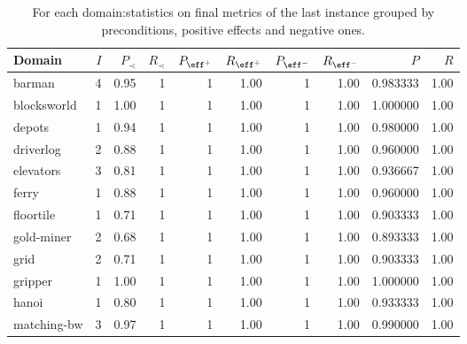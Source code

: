 \begin{table}
\centering
\caption{For each domain:statistics on final metrics of the last instance grouped by preconditions, positive effects and negative ones.}
\label{tab:overall_summary_certain_nostripsass}
\begin{tabular}{lrrrrrrrrr}
\toprule
      Domain & $I$ & $P_{\prec}$ & $R_{\prec}$ & $P_{\eff^{+}}$ & $R_{\eff^{+}}$ & $P_{\eff^{-}}$ & $R_{\eff^{-}}$ &       $P$ &   $R$ \\
\midrule
      barman &   4 &        0.95 &           1 &              1 &           1.00 &              1 &           1.00 &  0.983333 &  1.00 \\
 blocksworld &   1 &        1.00 &           1 &              1 &           1.00 &              1 &           1.00 &  1.000000 &  1.00 \\
      depots &   1 &        0.94 &           1 &              1 &           1.00 &              1 &           1.00 &  0.980000 &  1.00 \\
   driverlog &   2 &        0.88 &           1 &              1 &           1.00 &              1 &           1.00 &  0.960000 &  1.00 \\
   elevators &   3 &        0.81 &           1 &              1 &           1.00 &              1 &           1.00 &  0.936667 &  1.00 \\
       ferry &   1 &        0.88 &           1 &              1 &           1.00 &              1 &           1.00 &  0.960000 &  1.00 \\
   floortile &   1 &        0.71 &           1 &              1 &           1.00 &              1 &           1.00 &  0.903333 &  1.00 \\
  gold-miner &   2 &        0.68 &           1 &              1 &           1.00 &              1 &           1.00 &  0.893333 &  1.00 \\
        grid &   2 &        0.71 &           1 &              1 &           1.00 &              1 &           1.00 &  0.903333 &  1.00 \\
     gripper &   1 &        1.00 &           1 &              1 &           1.00 &              1 &           1.00 &  1.000000 &  1.00 \\
       hanoi &   1 &        0.80 &           1 &              1 &           1.00 &              1 &           1.00 &  0.933333 &  1.00 \\
 matching-bw &   3 &        0.97 &           1 &              1 &           1.00 &              1 &           1.00 &  0.990000 &  1.00 \\

\end{tabular}
\end{table}
